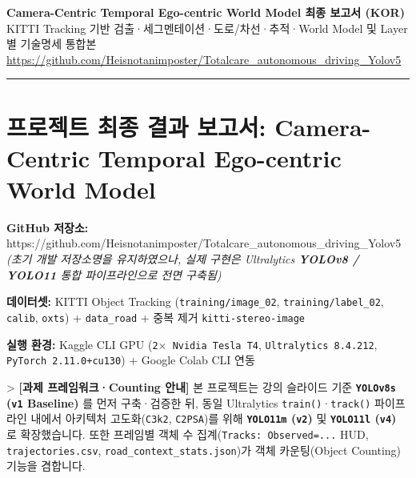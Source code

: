 \documentclass[10.5pt,a4paper]{article}
\begin{document}
\begin{center}
{\LARGE\bfseries Camera-Centric Temporal Ego-centric World Model 최종 보고서 (KOR)}\\[6pt]
{\normalsize\color{gray} KITTI Tracking 기반 검출·세그멘테이션·도로/차선·추적·World Model 및 Layer별 기술명세 통합본}\\[4pt]
{\small\href{https://github.com/Heisnotanimposter/Totalcare_autonomous_driving_Yolov5}{https://github.com/Heisnotanimposter/Totalcare\_autonomous\_driving\_Yolov5}}
\end{center}
\vspace{4pt}
\hrule
\vspace{8pt}

\tableofcontents
\newpage
\section{프로젝트 최종 결과 보고서: Camera-Centric Temporal Ego-centric World Model}

\textbf{GitHub 저장소:} https:\allowbreak{}/\allowbreak{}/\allowbreak{}github.\allowbreak{}com/\allowbreak{}Heisnotanimposter/\allowbreak{}Totalcare\_\allowbreak{}autonomous\_\allowbreak{}driving\_\allowbreak{}Yolov5 \textit{(초기 개발 저장소명을 유지하였으나, 실제 구현은 Ultralytics \textbf{YOLOv8 / YOLO11} 통합 파이프라인으로 전면 구축됨)}

\textbf{데이터셋:} KITTI Object Tracking (\texttt{training/\allowbreak{}image\_\allowbreak{}02}, \texttt{training/\allowbreak{}label\_\allowbreak{}02}, \texttt{calib}, \texttt{oxts}) + \texttt{data\_\allowbreak{}road} + 중복 제거 \texttt{kitti-\allowbreak{}stereo-\allowbreak{}image}

\textbf{실행 환경:} Kaggle CLI GPU (\texttt{2$\times$ Nvidia Tesla T4}, \texttt{Ultralytics 8.\allowbreak{}4.\allowbreak{}212}, \texttt{PyTorch 2.\allowbreak{}11.\allowbreak{}0+cu130}) + Google Colab CLI 연동


> \textbf{[과제 프레임워크·Counting 안내]} 본 프로젝트는 강의 슬라이드 기준 \textbf{\texttt{YOLOv8s} (\texttt{v1} Baseline)} 를 먼저 구축·검증한 뒤, 동일 Ultralytics \texttt{train()}·\texttt{track()} 파이프라인 내에서 아키텍처 고도화(\texttt{C3k2}, \texttt{C2PSA})를 위해 \textbf{\texttt{YOLO11m} (\texttt{v2})} 및 \textbf{\texttt{YOLO11l} (\texttt{v4})} 로 확장했습니다. 또한 프레임별 객체 수 집계(\texttt{Tracks:\allowbreak{} Observed=.\allowbreak{}.\allowbreak{}.\allowbreak{}} HUD, \texttt{trajectories.\allowbreak{}csv}, \texttt{road\_\allowbreak{}context\_\allowbreak{}stats.\allowbreak{}json})가 객체 카운팅(Object Counting) 기능을 겸합니다.
\end{document}
